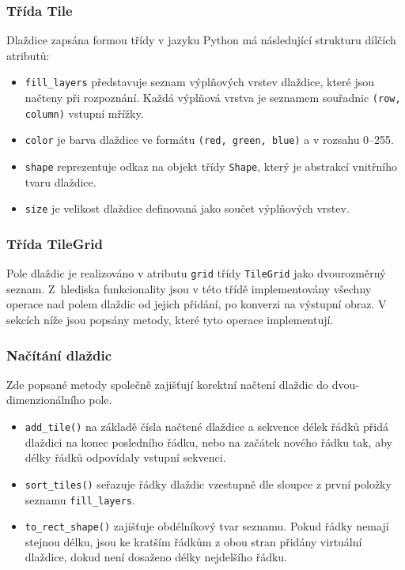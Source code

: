 \subsubsection*{Třída Tile}
Dlaždice zapsána formou třídy v jazyku Python má následující strukturu dílčích atributů:
\begin{itemize}
    \item \verb|fill_layers| představuje seznam výplňových vrstev dlaždice, které jsou načteny při rozpoznání. Každá výplňová vrstva je seznamem souřadnic \verb|(row, column)| vstupní mřížky.
    \item \verb|color| je barva dlaždice ve formátu \verb|(red, green, blue)| a v rozsahu 0--255.
    \item \verb|shape| reprezentuje odkaz na objekt třídy \verb|Shape|, který je abstrakcí vnitřního tvaru dlaždice.
    \item \verb|size| je velikost dlaždice definovaná jako součet výplňových vrstev.
\end{itemize}

\subsubsection*{Třída TileGrid}
Pole dlaždic je realizováno v atributu \verb|grid| třídy \verb|TileGrid| jako dvourozměrný seznam. Z~hlediska funkcionality jsou v této třídě implementovány všechny operace nad polem dlaždic od jejich přidání, po konverzi na výstupní obraz. V sekcích níže jsou popsány metody, které tyto operace implementují.

\subsubsection*{Načítání dlaždic}
Zde popsané metody společně zajišťují korektní načtení dlaždic do dvou-dimenzionálního pole.

\begin{itemize}
    \item \verb|add_tile()| na základě čísla načtené dlaždice a sekvence délek řádků přidá dlaždici na konec posledního řádku, nebo na začátek nového řádku tak, aby délky řádků odpovídaly vstupní sekvenci.
    \item \verb|sort_tiles()| seřazuje řádky dlaždic vzestupně dle sloupce z první položky seznamu \verb|fill_layers|. 
    \item \verb|to_rect_shape()| zajišťuje obdélníkový tvar seznamu. Pokud řádky nemají stejnou délku, jsou ke kratším řádkům z obou stran přidány virtuální dlaždice, dokud není dosaženo délky nejdelšího řádku.
\end{itemize}

